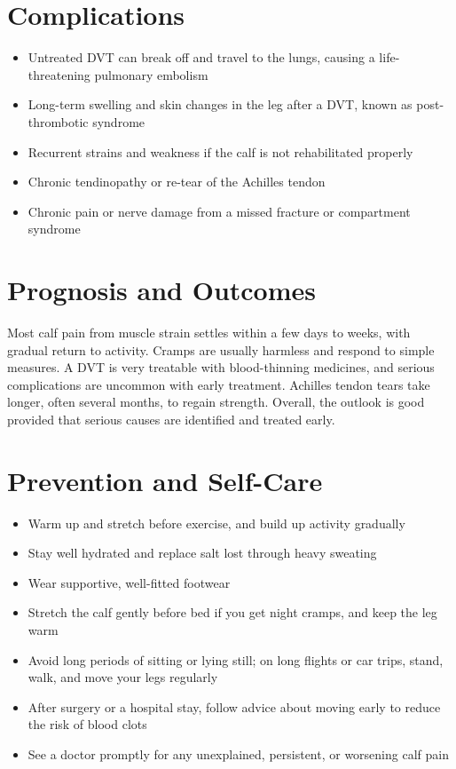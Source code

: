 \section*{Complications}
\begin{itemize}
    \item Untreated DVT can break off and travel to the lungs, causing a life-threatening pulmonary embolism
    \item Long-term swelling and skin changes in the leg after a DVT, known as post-thrombotic syndrome
    \item Recurrent strains and weakness if the calf is not rehabilitated properly
    \item Chronic tendinopathy or re-tear of the Achilles tendon
    \item Chronic pain or nerve damage from a missed fracture or compartment syndrome
\end{itemize}

\section*{Prognosis and Outcomes}
Most calf pain from muscle strain settles within a few days to weeks, with gradual return to activity. Cramps are usually harmless and respond to simple measures. A DVT is very treatable with blood-thinning medicines, and serious complications are uncommon with early treatment. Achilles tendon tears take longer, often several months, to regain strength. Overall, the outlook is good provided that serious causes are identified and treated early.

\section*{Prevention and Self-Care}
\begin{itemize}
    \item Warm up and stretch before exercise, and build up activity gradually
    \item Stay well hydrated and replace salt lost through heavy sweating
    \item Wear supportive, well-fitted footwear
    \item Stretch the calf gently before bed if you get night cramps, and keep the leg warm
    \item Avoid long periods of sitting or lying still; on long flights or car trips, stand, walk, and move your legs regularly
    \item After surgery or a hospital stay, follow advice about moving early to reduce the risk of blood clots
    \item See a doctor promptly for any unexplained, persistent, or worsening calf pain
\end{itemize}

